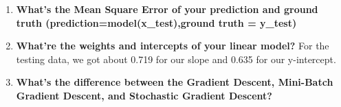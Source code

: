 \documentclass{article}
\begin{document}
\begin{enumerate}
\begin{figure}
\begin{subfigure}[b]{0.3\linewidth}
								\caption{Testing Data Error}
						\end{subfigure}
				\end{figure}

		\item \textbf{What's the Mean Square Error of your prediction and ground truth
				(prediction=model(x\_test),ground truth = y\_test)}

		\item \textbf{What're the weights and intercepts of your linear model?}
				For the testing data, we got about 0.719 for our slope and 0.635 for our 
				y-intercept.

		\item \textbf{What's the difference between the Gradient Descent, Mini-Batch Gradient
				Descent, and Stochastic Gradient Descent?}
\end{enumerate}
\end{document}
